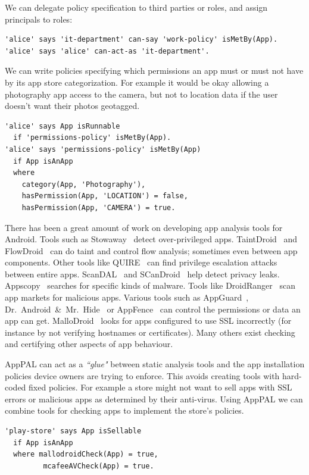 \documentclass[]{llncs}
\newcommand{\citep}[1]{\cite{#1}}
\begin{document}
We can delegate policy specification to third parties or roles, and assign principals to roles:
\begin{lstlisting}
'alice' says 'it-department' can-say 'work-policy' isMetBy(App).
'alice' says 'alice' can-act-as 'it-department'.
\end{lstlisting}
We can write policies specifying which permissions an app must or must not have by its app store categorization.
For example it would be okay allowing a photography app access to the camera, but not to location data if the user doesn't want their photos geotagged.
\begin{lstlisting}
'alice' says App isRunnable
  if 'permissions-policy' isMetBy(App).
'alice' says 'permissions-policy' isMetBy(App)
  if App isAnApp
  where
    category(App, 'Photography'),
    hasPermission(App, 'LOCATION') = false,
    hasPermission(App, 'CAMERA') = true.
\end{lstlisting}

There has been a great amount of work on developing app analysis tools for Android.
Tools such as Stowaway~\cite{Felt:2011kj} detect over-privileged apps.
TaintDroid~\cite{Enck:2010uw} and FlowDroid~\cite{Arzt:2014kf,Li:2015wo} can do taint and control flow analysis; sometimes even between app components.
Other tools like QUIRE~\cite{Bugiel:2012ui} can find privilege escalation attacks between entire apps.
ScanDAL~\cite{Kim:2012vt} and SCanDroid~\cite{Fuchs:2009vi} help detect privacy leaks.
Appscopy~\cite{Feng:kPGZr_ja} searches for specific kinds of malware.
Tools like DroidRanger~\cite{Zhou:2012tb} scan app markets for malicious apps.
Various tools such as AppGuard~\cite{Backes:2012vm}, Dr.~Android~\&~Mr.~Hide~\cite{Jeon:2012ki} or AppFence~\cite{Hornyack:2011wq} can control the permissions or data an app can get.
MalloDroid~\citep{Fahl:2012dj} looks for apps configured to use SSL incorrectly (for instance by not verifying hostnames or certificates).
Many others exist checking and certifying other aspects of app behaviour.

AppPAL can act as a \emph{``glue"} between static analysis tools and the app installation policies device owners are trying to enforce.
This avoids creating tools with hard-coded fixed policies.
For example a store might not want to sell apps with SSL errors or malicious apps as determined by their anti-virus.
Using AppPAL we can combine tools for checking apps to implement the store's policies.
\begin{lstlisting}
'play-store' says App isSellable
  if App isAnApp
  where mallodroidCheck(App) = true,
         mcafeeAVCheck(App) = true.
\end{lstlisting}
\end{document}
